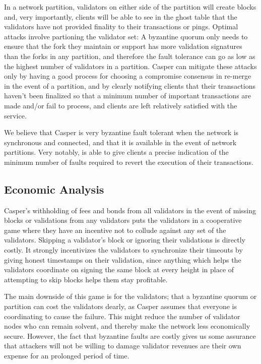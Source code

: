 \documentclass[11pt,a4paper]{article}
\begin{document}
In a network partition, validators on either side of the partition will create blocks and, very importantly, clients will be able to see in the ghost table that the validators have not provided finality to their transactions or pings. Optimal attacks involve partioning the validator set: A byzantine quorum only needs to ensure that the fork they maintain or support has more validation signatures than the forks in any partition, and therefore the fault tolerance can go as low as the highest number of validators in a partition. Casper can mitigate these attacks only by having a good process for choosing a compromise consensus in re-merge in the event of a partition, and by clearly notifying clients that their transactions haven't been finalized so that a minimum number of important transactions are made and/or fail to process, and clients are left relatively satisfied with the service.

We believe that Casper is very byzantine fault tolerant when the network is synchronous and connected, and that it is available in the event of network partitions. Very notably, is able to give clients a precise indication of the minimum number of faults required to revert the execution of their transactions.


\subsection{Economic Analysis}


Casper's withholding of fees and bonds from all validators in the event of missing blocks or validations from any validators puts the validators in a cooperative game where they have an incentive not to collude against any set of the validators. Skipping a validator's block or ignoring their validations is directly costly. It strongly incentivizes the validators to synchronize their timeouts by giving honest timestamps on their validation, since anything which helps the validators coordinate on signing the same block at every height in place of attempting to skip blocks helps them stay profitable. 

The main downside of this game is for the validators; that a byzantine quorum or partition can cost the validators dearly, as Casper assumes that everyone is coordinating to cause the failure. This might reduce the number of validator nodes who can remain solvent, and thereby make the network less economically secure. However, the fact that byzantine faults are costly gives us some assurance that attackers will not be willing to damage validator revenues are their own expense for an prolonged period of time.
\end{document}
